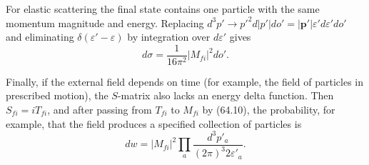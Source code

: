 For elastic scattering the final state contains one particle with the same momentum magnitude and energy. Replacing $d^3p'\to p'^2d|p'|do'=|\mathbf p'|\varepsilon'd\varepsilon'do'$ and eliminating $\delta(\varepsilon'-\varepsilon)$ by integration over $d\varepsilon'$ gives
\begin{equation}
d\sigma=\frac1{16\pi^2}|M_{fi}|^2do'.
\tag{64.26}
\end{equation}

Finally, if the external field depends on time (for example, the field of particles in prescribed motion), the $S$-matrix also lacks an energy delta function. Then $S_{fi}=iT_{fi}$, and after passing from $T_{fi}$ to $M_{fi}$ by (64.10), the probability, for example, that the field produces a specified collection of particles is
\begin{equation}
dw=|M_{fi}|^2\prod_a\frac{d^3p'_a}{(2\pi)^3 2\varepsilon'_a}.
\tag{64.27}
\end{equation}
